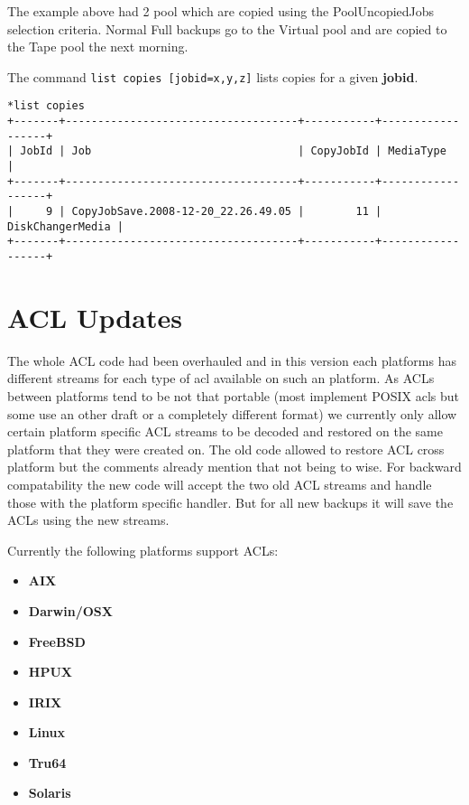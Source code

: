 The example above had 2 pool which are copied using the PoolUncopiedJobs
selection criteria. Normal Full backups go to the Virtual pool and are copied
to the Tape pool the next morning.

The command \texttt{list copies [jobid=x,y,z]} lists copies for a given
\textbf{jobid}.

\begin{verbatim}
*list copies
+-------+------------------------------------+-----------+------------------+
| JobId | Job                                | CopyJobId | MediaType        |
+-------+------------------------------------+-----------+------------------+
|     9 | CopyJobSave.2008-12-20_22.26.49.05 |        11 | DiskChangerMedia |
+-------+------------------------------------+-----------+------------------+
\end{verbatim}

\section{ACL Updates}
The whole ACL code had been overhauled and in this version each platforms has
different streams for each type of acl available on such an platform. As ACLs
between platforms tend to be not that portable (most implement POSIX acls but
some use an other draft or a completely different format) we currently only
allow certain platform specific ACL streams to be decoded and restored on the
same platform that they were created on.  The old code allowed to restore ACL
cross platform but the comments already mention that not being to wise. For
backward compatability the new code will accept the two old ACL streams and
handle those with the platform specific handler. But for all new backups it
will save the ACLs using the new streams.

Currently the following platforms support ACLs:

\begin{itemize}
 \item {\bf AIX}
 \item {\bf Darwin/OSX}
 \item {\bf FreeBSD}
 \item {\bf HPUX}
 \item {\bf IRIX}
 \item {\bf Linux}
 \item {\bf Tru64}
 \item {\bf Solaris}
\end{itemize}

